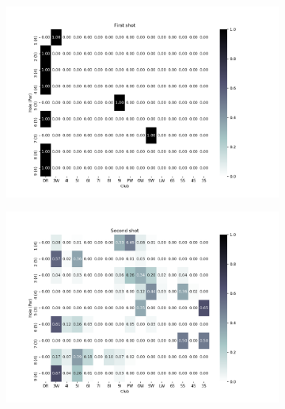 \documentclass{kththesis}
\begin{document}
\begin{figure}
    \centering
    \begin{subfigure}{\textwidth}
    \centering
    \includegraphics[height=0.3\textheight]{AgentClubChoices/MPDQN_Pebble_Club_Choices_First_Shot.png} 
    \end{subfigure}
    \begin{subfigure}{\textwidth}
    \centering
    \includegraphics[height=0.3\textheight]{AgentClubChoices/MPDQN_Pebble_Club_Choices_Second_Shot.png} 
    \end{subfigure}
    \begin{subfigure}{\textwidth}
    \centering

\end{subfigure}
\end{figure}
\end{document}
